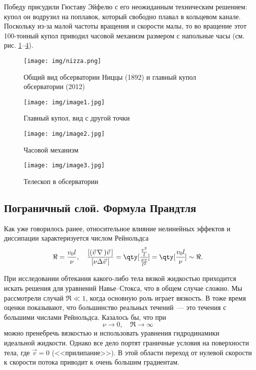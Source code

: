 Победу присудили Гюставу Эйфелю с его неожиданным техническим решением: купол он водрузил на поплавок, который свободно плавал в кольцевом канале.
Поскольку из-за малой частоты вращения и скорости малы, то во вращение этот 100-тонный купол приводил часовой механизм  размером с напольные часы (см. рис. \ref{fig:nizza}--\ref{fig:nizzai3}).

\begin{figure}[H]
	\centering
	\texttt{[image: img/nizza.png]}
	\caption{Общий вид обсерватории Ниццы (1892) и главный купол обсерватории (2012)}
	\label{fig:nizza}
\end{figure}
\begin{figure}[H]
	\centering
	\texttt{[image: img/image1.jpg]}
	\caption{Главный купол, вид с другой точки}
	\label{fig:nizzai1}
\end{figure}
\begin{figure}[H]
	\centering
	\texttt{[image: img/image2.jpg]}
	\caption{Часовой механизм}
	\label{fig:nizzai2}
\end{figure}
\begin{figure}[H]
	\centering
	\texttt{[image: img/image3.jpg]}
    \caption{Телескоп в обсерватории}
	\label{fig:nizzai3}
\end{figure}


\subsection{Пограничный слой. Формула Прандтля}

 Как уже говорилось ранее, относительное влияние нелинейных эффектов и диссипации характеризуется числом Рейнольдса
\begin{equation}
    \Re = \frac{v_0 l}{\nu}, \quad \frac{[(\vec{v}\, \nabla\,)\vec{v}\,]}{[\nu \Delta \vec{v}\,]}=
    \qty[
    	\cfrac{\frac{v^2}{l}}{\frac{\nu v}{l^2}}
    	]=\qty[\cfrac{v_0 l}{\nu}] \sim \Re.
\end{equation}

При исследовании обтекания какого-либо тела вязкой жидкостью приходится искать решения для уравнений Навье--Стокса, что в общем случае сложно.
Мы рассмотрели случай  $\Re \ll 1$, когда основную роль играет вязкость. В тоже время оценки показывают, что большинство реальных течений~--- это течения с большими числами Рейнольдса. Казалось бы, что при
\begin{equation}
 	\nu \to 0, \quad \Re \to \infty
 \end{equation}
можно пренебречь вязкостью и использовать уравнения гидродинамики идеальной жидкости. Однако все дело портят граничные условия на поверхности тела, где $\vec{v}=0$ (<<прилипание>>). В этой области переход от нулевой скорости к скорости потока приводит к очень большим градиентам.

